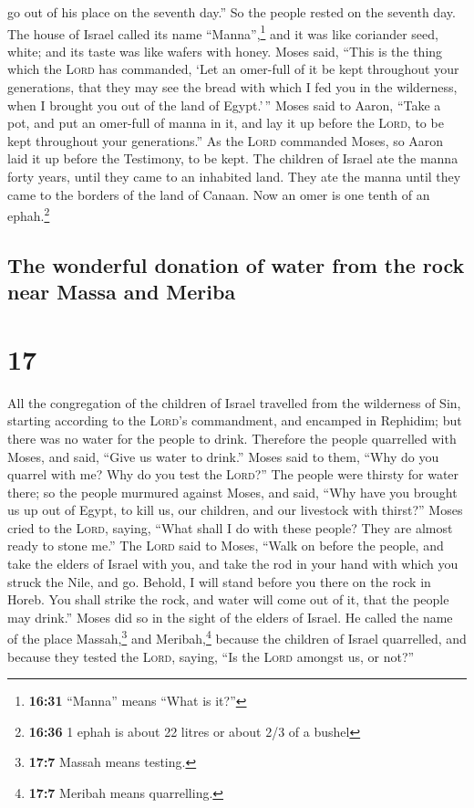 go out of his place on the seventh day.''  So the people
rested on the seventh day.  The house of Israel called
its name ``Manna'',\footnote{\textbf{16:31} ``Manna'' means ``What is
  it?''} and it was like coriander seed, white; and its taste was like
wafers with honey.  Moses said, ``This is the thing which
the \textsc{Lord} has commanded, `Let an omer-full of it be kept
throughout your generations, that they may see the bread with which I
fed you in the wilderness, when I brought you out of the land of
Egypt.'\,''  Moses said to Aaron, ``Take a pot, and put
an omer-full of manna in it, and lay it up before the \textsc{Lord}, to
be kept throughout your generations.''  As the
\textsc{Lord} commanded Moses, so Aaron laid it up before the Testimony,
to be kept.  The children of Israel ate the manna forty
years, until they came to an inhabited land. They ate the manna until
they came to the borders of the land of Canaan.  Now an
omer is one tenth of an ephah.\footnote{\textbf{16:36} 1 ephah is about
  22 litres or about 2/3 of a bushel}

\hypertarget{the-wonderful-donation-of-water-from-the-rock-near-massa-and-meriba}{%
\subsection{The wonderful donation of water from the rock near Massa and
Meriba}\label{the-wonderful-donation-of-water-from-the-rock-near-massa-and-meriba}}

\hypertarget{section-16}{%
\section{17}\label{section-16}}

 All the congregation of the children of Israel travelled
from the wilderness of Sin, starting according to the \textsc{Lord}'s
commandment, and encamped in Rephidim; but there was no water for the
people to drink.  Therefore the people quarrelled with
Moses, and said, ``Give us water to drink.'' Moses said to them, ``Why
do you quarrel with me? Why do you test the \textsc{Lord}?''
 The people were thirsty for water there; so the people
murmured against Moses, and said, ``Why have you brought us up out of
Egypt, to kill us, our children, and our livestock with thirst?''
 Moses cried to the \textsc{Lord}, saying, ``What shall I
do with these people? They are almost ready to stone me.''
 The \textsc{Lord} said to Moses, ``Walk on before the
people, and take the elders of Israel with you, and take the rod in your
hand with which you struck the Nile, and go.  Behold, I
will stand before you there on the rock in Horeb. You shall strike the
rock, and water will come out of it, that the people may drink.'' Moses
did so in the sight of the elders of Israel.  He called
the name of the place Massah,\footnote{\textbf{17:7} Massah means
  testing.} and Meribah,\footnote{\textbf{17:7} Meribah means
  quarrelling.} because the children of Israel quarrelled, and because
they tested the \textsc{Lord}, saying, ``Is the \textsc{Lord} amongst
us, or not?''

